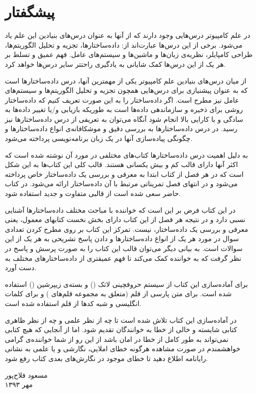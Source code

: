 \section*{پیشگفتار}
در علم کامپیوتر درس‌هایی وجود دارند که از آنها به عنوان درس‌های بنیادین این علم یاد می‌شود. برخی از این درس‌ها عبارت‌اند از: داده‌ساختارها، تجزیه و تحلیل الگوریتم‌ها، طراحی کامپایلر، نظریه‌ی زبان‌ها و ماشین‌ها و سیستم‌های عامل. فهم عمیق و تسلط بر هر یک از این درس‌ها کمک شایانی به یادگیری راحتتر سایر درس‌ها خواهد کرد.

از میان درس‌های بنیادین علم کامپیوتر یکی از مهمترین آنها، درس داده‌ساختارها است که به عنوان پیشنیازی برای درس‌هایی همچون تجزیه و تحلیل الگوریتم‌ها و سیستم‌های عامل نیز مطرح است. اگر داده‌ساختار را به این صورت تعریف کنیم که {\prq}داده‌ساختار روشی برای ذخیره و سازماندهی داده‌ها است به طوریکه بازیابی و/یا تغییر داده‌ها به سادگی و با کارایی بالا انجام شود{\plq} آنگاه می‌توان به تعریفی از درس داده‌ساختارها نیز رسید. در درس داده‌ساختارها به بررسی دقیق و موشکافانه‌ی انواع داده‌ساختارها و چگونگی پیاده‌سازی آنها در یک زبان برنامه‌نویسی پرداخته می‌شود.

به دلیل اهمیت درس داده‌ساختارها کتاب‌های مختلفی در مورد آن نوشته شده است که اکثر آنها دارای قالب کم و بیش یکسانی هستند. قالب کلی این کتاب‌ها به این شکل است که در هر فصل از کتاب ابتدا به معرفی و بررسی یک داده‌ساختار خاص پرداخته می‌شود و در انتهای فصل تمریناتی مرتبط با آن داده‌ساختار ارائه می‌شود. در کتاب حاضر سعی شده است از قالبی متفاوت و جدید استفاده شود.

در این کتاب فرض بر این است که خواننده با مباحث مختلف داده‌ساختارها آشنایی نسبی دارد و در نتیجه هر فصل از این کتاب دارای بخش نخست کتابهای معمول، یعنی معرفی و بررسی یک داده‌ساختار، نیست. تمرکز این کتاب بر روی مطرح کردن تعدادی سوال در مورد هر یک از انواع داده‌ساختارها و دادن پاسخ تشریحی به هر یک از این سوالات است. به بیانی دیگر می‌توان قالب این کتاب را به صورت پرسش و پاسخ در نظر گرفت که به خواننده کمک می‌کند تا فهم عمیقتری از داده‌ساختارهای مختلف به دست آورد.

برای آماده‌سازی این کتاب از سیستم حروفچینی لاتک ({\lr{\LaTeX}}) و بسته‌ی زیپرشین ({\lr{\XePersian}}) استفاده شده است. برای متن پارسی از قلم {} (متعلق به مجموعه قلم‌های {}) و برای کلمات انگلیسی و شبه کدها از قلم {} استفاده شده است.

در آماده‌سازی این کتاب تلاش شده است تا چه از نظر علمی و چه از نظر ظاهری کتابی شایسته و خالی از خطا به خوانندگان تقدیم شود. اما از آنجایی که هیچ کتابی نمی‌تواند به طور کامل از خطا در امان باشد از این رو از شما خواننده‌ی گرامی خواهشمندم در صورت مشاهده هرگونه خطای املایی، نگارشی و یا علمی به نشانی رایانامه {} اطلاع دهید تا خطای موجود در نگارش‌های بعدی کتاب رفع شود.

\begin{flushleft}
\small
مسعود فلاح‌پور\\
مهر ۱۳۹۳
\end{flushleft}